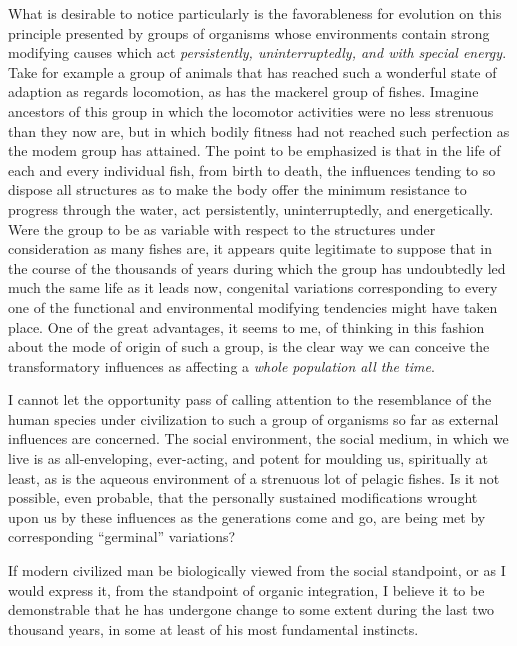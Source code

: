 \documentclass[a4paper, 11pt, oneside, polutonikogreek, english]{article}
\begin{document}
What is desirable to notice particularly is the favorableness for evolution on this principle presented by groups of organisms whose environments contain strong modifying causes which act \emph{persistently, uninterruptedly, and with special energy}. Take for example a group of animals that has reached such a wonderful state of adaption as regards locomotion, as has the mackerel group of fishes. Imagine ancestors of this group in which the locomotor activities were no less strenuous than they now are, but in which bodily fitness had not reached such perfection as the modem group has attained. The point to be emphasized is that in the life of each and every individual fish, from birth to death, the influences tending to so dispose all structures as to make the body offer the minimum resistance to progress through the water, act persistently, uninterruptedly, and energetically. Were the group to be as variable with respect to the structures under consideration as many fishes are, it appears quite legitimate to suppose that in the course of the thousands of years during which the group has undoubtedly led much the same life as it leads now, congenital variations corresponding to every one of the functional and environmental modifying tendencies might have taken place. One of the great advantages, it seems to me, of thinking in this fashion about the mode of origin of such a group, is the clear way we can conceive the transformatory influences as affecting a \emph{whole population all the time}.

I cannot let the opportunity pass of calling attention to the resemblance of the human species under civilization to such a group of organisms so far as external influences are concerned. The social environment, the social medium, in which we live is as all-enveloping, ever-acting, and potent for moulding us, spiritually at least, as is the aqueous environment of a strenuous lot of pelagic fishes. Is it not possible, even probable, that the personally sustained modifications wrought upon us by these influences as the generations come and go, are being met by corresponding ``germinal'' variations?

If modern civilized man be biologically viewed from the social standpoint, or as I would express it, from the standpoint of organic integration, I believe it to be demonstrable that he has undergone change to some extent during the last two thousand years, in some at least of his most fundamental instincts.
\end{document}
